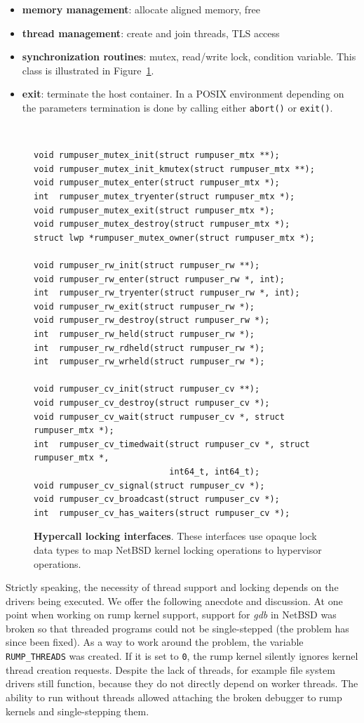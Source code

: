 \begin{itemize}
\item   \textbf{memory management}: allocate aligned memory, free
\item	\textbf{thread management}: create and join threads, TLS access
\item   \textbf{synchronization routines}: mutex, read/write lock,
	condition variable.  This class is illustrated in
	Figure~\ref{fig:rulock}.
\item   \textbf{exit}: terminate the host container.
	In a POSIX environment depending on the parameters termination is
	done by calling either \texttt{abort()} or \texttt{exit()}.
\end{itemize}

\begin{figure}[t]
{\tt \scriptsize
\begin{verbatim}
void rumpuser_mutex_init(struct rumpuser_mtx **);
void rumpuser_mutex_init_kmutex(struct rumpuser_mtx **);
void rumpuser_mutex_enter(struct rumpuser_mtx *);
int  rumpuser_mutex_tryenter(struct rumpuser_mtx *);
void rumpuser_mutex_exit(struct rumpuser_mtx *);
void rumpuser_mutex_destroy(struct rumpuser_mtx *);
struct lwp *rumpuser_mutex_owner(struct rumpuser_mtx *);

void rumpuser_rw_init(struct rumpuser_rw **);
void rumpuser_rw_enter(struct rumpuser_rw *, int);
int  rumpuser_rw_tryenter(struct rumpuser_rw *, int);
void rumpuser_rw_exit(struct rumpuser_rw *);
void rumpuser_rw_destroy(struct rumpuser_rw *);
int  rumpuser_rw_held(struct rumpuser_rw *);
int  rumpuser_rw_rdheld(struct rumpuser_rw *);
int  rumpuser_rw_wrheld(struct rumpuser_rw *);

void rumpuser_cv_init(struct rumpuser_cv **);
void rumpuser_cv_destroy(struct rumpuser_cv *);
void rumpuser_cv_wait(struct rumpuser_cv *, struct rumpuser_mtx *);
int  rumpuser_cv_timedwait(struct rumpuser_cv *, struct rumpuser_mtx *,
                           int64_t, int64_t);
void rumpuser_cv_signal(struct rumpuser_cv *);
void rumpuser_cv_broadcast(struct rumpuser_cv *);
int  rumpuser_cv_has_waiters(struct rumpuser_cv *);
\end{verbatim}}
\caption[Hypercall locking interfaces]{\textbf{Hypercall locking interfaces}.
These interfaces use opaque lock data types to map NetBSD kernel locking
operations to hypervisor operations.
}
\label{fig:rulock}
\end{figure}

Strictly speaking, the necessity of thread support and locking
depends on the drivers being executed.  We offer the following
anecdote and discussion.  At one point when working on rump kernel
support, support for \textit{gdb} in NetBSD was broken so that
threaded programs could not be single-stepped (the problem has
since been fixed).  As a way to work around the problem, the variable
\verb+RUMP_THREADS+ was created.  If it is set to \texttt{0}, the
rump kernel silently ignores kernel thread creation requests.
Despite the lack of threads, for example file system drivers still
function, because they do not directly depend on worker threads.
The ability to run without threads allowed attaching the broken debugger
to rump kernels and single-stepping them.


